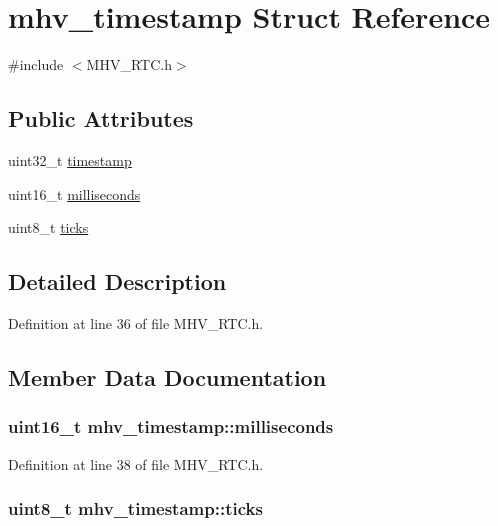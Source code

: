 \hypertarget{structmhv__timestamp}{\section{mhv\-\_\-timestamp Struct Reference}
\label{structmhv__timestamp}
}


{\ttfamily \#include $<$M\-H\-V\-\_\-\-R\-T\-C.\-h$>$}

\subsection*{Public Attributes}
\begin{DoxyCompactItemize}
\item 
uint32\-\_\-t \hyperlink{structmhv__timestamp_a0f520358e057865fb12a9153cae820c5}{timestamp}
\item 
uint16\-\_\-t \hyperlink{structmhv__timestamp_a8285e4adf91b7ddbec8ab65b5ab855e1}{milliseconds}
\item 
uint8\-\_\-t \hyperlink{structmhv__timestamp_a9580508b8bfb37df0713ad6b4ad58636}{ticks}
\end{DoxyCompactItemize}


\subsection{Detailed Description}


Definition at line 36 of file M\-H\-V\-\_\-\-R\-T\-C.\-h.



\subsection{Member Data Documentation}
\hypertarget{structmhv__timestamp_a8285e4adf91b7ddbec8ab65b5ab855e1}{
\subsubsection[{milliseconds}]{\setlength{\rightskip}{0pt plus 5cm}uint16\-\_\-t mhv\-\_\-timestamp\-::milliseconds}}\label{structmhv__timestamp_a8285e4adf91b7ddbec8ab65b5ab855e1}


Definition at line 38 of file M\-H\-V\-\_\-\-R\-T\-C.\-h.

\hypertarget{structmhv__timestamp_a9580508b8bfb37df0713ad6b4ad58636}{
\subsubsection[{ticks}]{\setlength{\rightskip}{0pt plus 5cm}uint8\-\_\-t mhv\-\_\-timestamp\-::ticks}}\label{structmhv__timestamp_a9580508b8bfb37df0713ad6b4ad58636}



